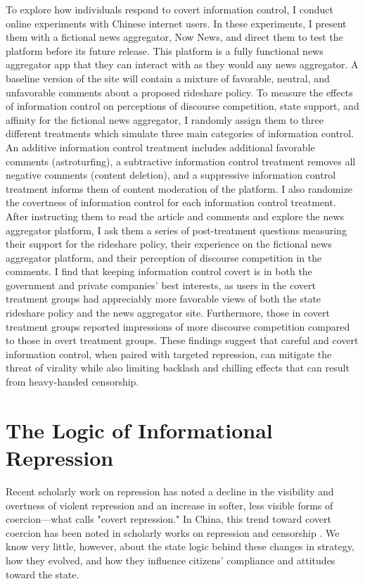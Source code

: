 \documentclass[11pt]{article}
\begin{document}
To explore how individuals respond to covert information control, I conduct online experiments with Chinese internet users. In these experiments, I present them with a fictional news aggregator, Now News, and direct them to test the platform before its future release. This platform is a fully functional news aggregator app that they can interact with as they would any news aggregator. A baseline version of the site will contain a mixture of favorable, neutral, and unfavorable comments about a proposed rideshare policy. To measure the effects of information control on perceptions of discourse competition, state support, and affinity for the fictional news aggregator, I randomly assign them to three different treatments which simulate three main categories of information control. An additive information control treatment includes additional favorable comments (astroturfing), a subtractive information control treatment removes all negative comments (content deletion), and a suppressive information control treatment informs them of content moderation of the platform. I also randomize the covertness of information control for each information control treatment. After instructing them to read the article and comments and explore the news aggregator platform, I ask them a series of post-treatment questions measuring their support for the rideshare policy, their experience on the fictional news aggregator platform, and their perception of discourse competition in the comments. I find that keeping information control covert is in both the government and private companies' best interests, as users in the covert treatment groups had appreciably more favorable views of both the state rideshare policy and the news aggregator site. Furthermore, those in covert treatment groups reported impressions of more discourse competition compared to those in overt treatment groups. These findings suggest that careful and covert information control, when paired with targeted repression, can mitigate the threat of virality while also limiting backlash and chilling effects that can result from heavy-handed censorship.

\section{The Logic of Informational Repression}

Recent scholarly work on repression has noted a decline in the visibility and overtness of violent repression \citep{fariss2014respect,fariss2019yes,guriev2019informational,hassan2022political} and an increase in softer, less visible forms of coercion---what \cite{davenport2005understanding} calls "covert repression." In China, this trend toward covert coercion has been noted in scholarly works on repression \citep{gallagher2021not,ong2018thugs} and censorship \citep{crete2016harmonize, ruan2021information, miller2018limits, miller2018delegated}. We know very little, however, about the state logic behind these changes in strategy, how they evolved, and how they influence citizens' compliance and attitudes toward the state.
\end{document}
